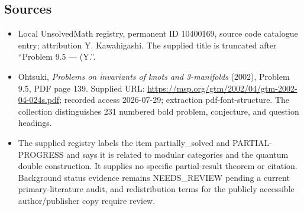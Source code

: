 \documentclass[11pt]{article}
\begin{document}
\subsection{Sources}
\begin{itemize}
\item Local UnsolvedMath registry, permanent ID 10400169, source code catalogue entry; attribution Y. Kawahigashi. The supplied title is truncated after ``Problem 9.5 --- (Y.''.
\item Ohtsuki, \emph{Problems on invariants of knots and 3-manifolds} (2002), Problem 9.5, PDF page 139. Supplied URL: \url{https://msp.org/gtm/2002/04/gtm-2002-04-024s.pdf}; recorded access 2026-07-29; extraction pdf-font-structure. The collection distinguishes 231 numbered bold problem, conjecture, and question headings.
\item The supplied registry labels the item partially\_solved and PARTIAL-PROGRESS and says it is related to modular categories and the quantum double construction. It supplies no specific partial-result theorem or citation. Background status evidence remains NEEDS\_REVIEW pending a current primary-literature audit, and redistribution terms for the publicly accessible author/publisher copy require review.
\end{itemize}
\end{document}
